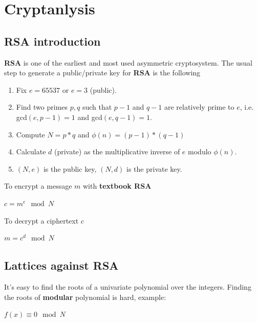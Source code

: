 \documentclass[a4paper,12pt]{report}
\begin{document}
\chapter{Cryptanlysis}


\section{RSA introduction}

\textbf{RSA} is one of the earliest and most used asymmetric cryptosystem.
The usual step to generate a public/private key for \textbf{RSA} is the following

\begin{enumerate}
    \item Fix $e = 65537$ or $e = 3$ (public).
    \item Find two primes $p, q$ such that $p - 1$ and $q - 1$ are relatively prime to $e$, i.e. gcd$(e, p-1) = 1$ and gcd$(e, q-1) = 1$.
    \item Compute $N = p * q$ and $\phi(n) = (p-1) * (q-1)$
    \item Calculate $d$ (private) as the multiplicative inverse of $e$ modulo $\phi(n)$.
    \item $(N, e)$ is the public key, $(N, d)$ is the private key.
\end{enumerate}

To encrypt a message $m$ with \textbf{textbook RSA}

\begin{center}
    $c = m^e \mod N$
\end{center}

To decrypt a ciphertext $c$

\begin{center}
    $m = c^d \mod N$
\end{center}

\section{Lattices against RSA}

It's easy to find the roots of a univariate polynomial over the integers. Finding the roots of \textbf{modular} polynomial is hard, example:

\begin{center}
    $f(x) \equiv 0 \mod N$
\end{center}
\end{document}

